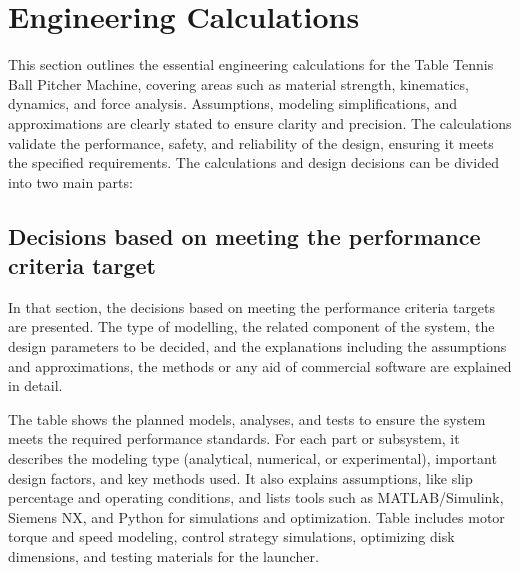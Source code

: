 \documentclass[12pt]{article}
\begin{document}
\section{Engineering Calculations}

This section outlines the essential engineering calculations for the Table Tennis Ball Pitcher Machine, covering areas such as material strength, kinematics, dynamics, and force analysis. Assumptions, modeling simplifications, and approximations are clearly stated to ensure clarity and precision. The calculations validate the performance, safety, and reliability of the design, ensuring it meets the specified requirements. 
The calculations and design decisions can be divided into two main parts:

\subsection{Decisions based on meeting the performance criteria target}

In that section, the decisions based on meeting the performance criteria targets are presented. The type of modelling, the related component of the system, the design parameters to be decided, and the explanations including the assumptions and approximations, the methods or any aid of commercial software are explained in detail.

The table shows the planned models, analyses, and tests to ensure the system meets the required performance standards. For each part or subsystem, it describes the modeling type (analytical, numerical, or experimental), important design factors, and key methods used. It also explains assumptions, like slip percentage and operating conditions, and lists tools such as MATLAB/Simulink, Siemens NX, and Python for simulations and optimization. Table includes motor torque and speed modeling, control strategy simulations, optimizing disk dimensions, and testing materials for the launcher. 
\end{document}
